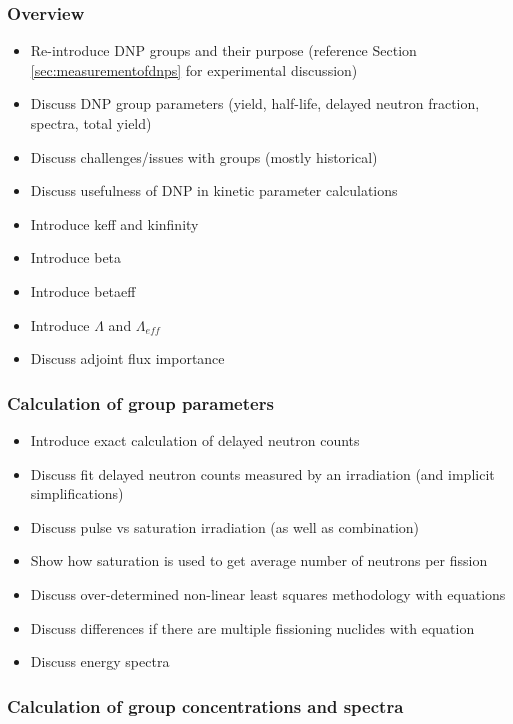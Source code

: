 \subsubsection{Overview}

\begin{itemize}
    \item Re-introduce \gls{DNP} groups and their purpose (reference Section \ref{sec:measurementofdnps} for experimental discussion)
    \item Discuss \gls{DNP} group parameters (yield, half-life, delayed neutron fraction, spectra, total yield)
    \item Discuss challenges/issues with groups (mostly historical)
    \item Discuss usefulness of \gls{DNP} in kinetic parameter calculations
    \item Introduce keff and kinfinity
    \item Introduce beta
    \item Introduce betaeff
    \item Introduce $\Lambda$ and $\Lambda_{eff}$
    \item Discuss adjoint flux importance
\end{itemize}

\subsubsection{Calculation of group parameters}
\label{ref:calc-group-param}

\begin{itemize}
    \item Introduce exact calculation of delayed neutron counts
    \item Discuss fit delayed neutron counts measured by an irradiation (and implicit simplifications)
    \item Discuss pulse vs saturation irradiation (as well as combination)
    \item Show how saturation is used to get average number of neutrons per fission
    \item Discuss over-determined non-linear least squares methodology with equations
    \item Discuss differences if there are multiple fissioning nuclides with equation
    \item Discuss energy spectra
\end{itemize}

\subsubsection{Calculation of group concentrations and spectra}
\label{ref:calc-group-concsandspec}

